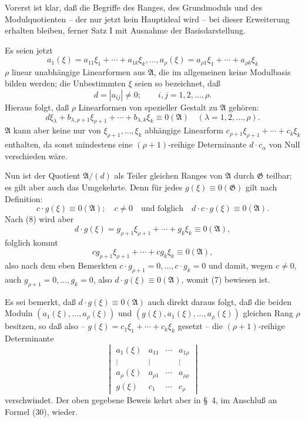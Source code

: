 \documentclass[11pt]{article}
\newcommand{\Amod}{\mathfrak A}
\newcommand{\Gmod}{\mathfrak G}
\newcommand{\zero}[1]{\equiv 0(#1)}
\begin{document}
Vorerst ist klar, daß die Begriffe des Ranges, des Grundmoduls und des Modulquotienten -- der nur jetzt kein Hauptideal wird -- bei dieser Erweiterung erhalten bleiben, ferner Satz I mit Ausnahme der Basisdarstellung.

Es seien jetzt
\[
 a_1(\xi)=a_{11}\xi_1+\cdots+a_{1k}\xi_k,\ldots,
 a_\rho(\xi)=a_{\rho1}\xi_1+\cdots+a_{\rho k}\xi_k
\]
$\rho$ linear unabhängige Linearformen aus $\Amod$, die im allgemeinen keine Modulbasis bilden werden; die Unbestimmten $\xi$ seien so bezeichnet, daß
\[
 d=|a_{ij}|\ne0;\qquad i,j=1,2,\ldots,\rho.
\]
Hieraus folgt, daß $\rho$ Linearformen von spezieller Gestalt zu $\Amod$ gehören:
\begin{equation}
 d\xi_\lambda+b_{\lambda,\rho+1}\xi_{\rho+1}+\cdots+b_{\lambda,k}\xi_k\zero{\Amod}
 \quad(\lambda=1,2,\ldots,\rho).
\tag{8}
\end{equation}
$\Amod$ kann aber keine nur von $\xi_{\rho+1},\ldots,\xi_k$ abhängige Linearform $c_{\rho+1}\xi_{\rho+1}+\cdots+c_k\xi_k$ enthalten, da sonst mindestens eine $(\rho+1)$-reihige Determinante $d\cdot c_\alpha$ von Null verschieden wäre.

Nun ist der Quotient $\Amod/(d)$ als Teiler gleichen Ranges von $\Amod$ durch $\Gmod$ teilbar; es gilt aber auch das Umgekehrte. Denn für jedes $g(\xi)\zero{\Gmod}$ gilt nach Definition:
\[
 c\cdot g(\xi)\zero{\Amod};\quad c\ne0
 \quad\text{und folglich}\quad d\cdot c\cdot g(\xi)\zero{\Amod}.
\]
Nach (8) wird aber
\[
 d\cdot g(\xi)=g_{\rho+1}\xi_{\rho+1}+\cdots+g_k\xi_k\zero{\Amod},
\]
folglich kommt
\[
 c g_{\rho+1}\xi_{\rho+1}+\cdots+c g_k\xi_k\zero{\Amod},
\]
also nach dem eben Bemerkten $c\cdot g_{\rho+1}=0,\ldots,c\cdot g_k=0$ und damit, wegen $c\ne0$, auch $g_{\rho+1}=0,\ldots,g_k=0$, also $d\cdot g(\xi)\zero{\Amod}$, womit (7) bewiesen ist.

Es sei bemerkt, daß $d\cdot g(\xi)\zero{\Amod}$ auch direkt daraus folgt, daß die beiden Moduln $(a_1(\xi),\ldots,a_\rho(\xi))$ und $(g(\xi),a_1(\xi),\ldots,a_\rho(\xi))$ gleichen Rang $\rho$ besitzen, so daß also -- $g(\xi)=c_1\xi_1+\cdots+c_k\xi_k$ gesetzt -- die $(\rho+1)$-reihige Determinante
\[
\begin{vmatrix}
 a_1(\xi)&a_{11}&\cdots&a_{1\rho}\\
 \vdots&\vdots&&\vdots\\
 a_\rho(\xi)&a_{\rho1}&\cdots&a_{\rho\rho}\\
 g(\xi)&c_1&\cdots&c_\rho
\end{vmatrix}
\]
verschwindet. Der oben gegebene Beweis kehrt aber in §~4, im Anschluß an Formel (30), wieder.
\end{document}

